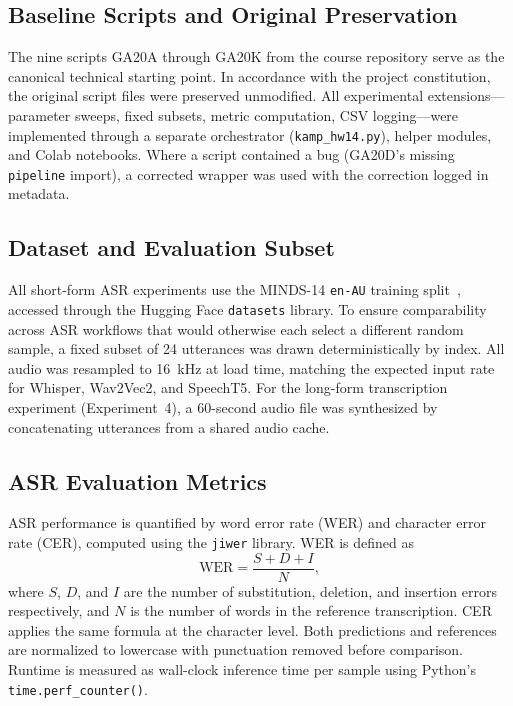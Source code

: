 \documentclass[conference]{IEEEtran}
\begin{document}
\subsection{Baseline Scripts and Original Preservation}

The nine scripts GA20A through GA20K from the course repository serve as the canonical technical starting point. In accordance with the project constitution, the original script files were preserved unmodified. All experimental extensions---parameter sweeps, fixed subsets, metric computation, CSV logging---were implemented through a separate orchestrator (\texttt{kamp\_hw14.py}), helper modules, and Colab notebooks. Where a script contained a bug (GA20D's missing \texttt{pipeline} import), a corrected wrapper was used with the correction logged in metadata.

\subsection{Dataset and Evaluation Subset}

All short-form ASR experiments use the MINDS-14 \texttt{en-AU} training split~\cite{gerz2021}, accessed through the Hugging Face \texttt{datasets} library. To ensure comparability across ASR workflows that would otherwise each select a different random sample, a fixed subset of 24 utterances was drawn deterministically by index. All audio was resampled to 16~kHz at load time, matching the expected input rate for Whisper, Wav2Vec2, and SpeechT5. For the long-form transcription experiment (Experiment~4), a 60-second audio file was synthesized by concatenating utterances from a shared audio cache.

\subsection{ASR Evaluation Metrics}

ASR performance is quantified by word error rate (WER) and character error rate (CER), computed using the \texttt{jiwer} library. WER is defined as
\begin{equation}
\text{WER} = \frac{S + D + I}{N},
\end{equation}
where $S$, $D$, and $I$ are the number of substitution, deletion, and insertion errors respectively, and $N$ is the number of words in the reference transcription. CER applies the same formula at the character level. Both predictions and references are normalized to lowercase with punctuation removed before comparison. Runtime is measured as wall-clock inference time per sample using Python's \texttt{time.perf\_counter()}.
\end{document}
